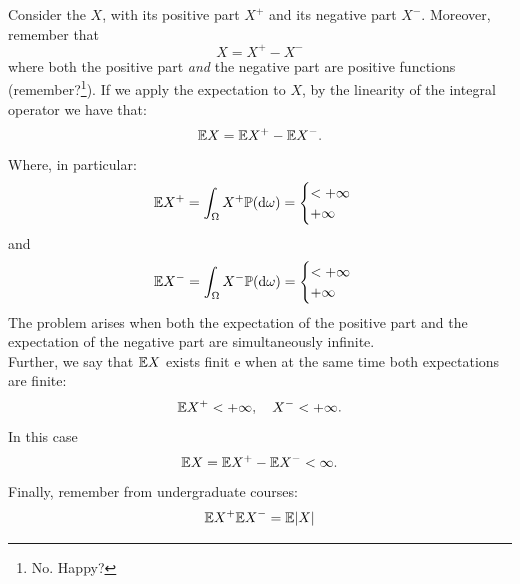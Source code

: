 \documentclass{report}
\begin{document}
Consider the \rv{} $X$, with its positive part $X^+$ and its negative part $X^-$. Moreover, remember that 
\[X=X^+-X^-\]
where both the positive part \textit{and} the negative part are positive functions (remember?\footnote{No. Happy?}). If we apply the expectation to $X$, by the linearity of the integral operator we have that:
\[\mathbb{E} X=\mathbb{E} X^+-\mathbb{E} X^-.\]
Where, in particular:
\[\mathbb{E} X^+=\int_\Omega X^+\mathbb{P}(\mathop{}\!\mathrm{d}\omega)=\begin{cases}
	<+\infty\\
	+\infty
\end{cases}\]
and
\[\mathbb{E} X^-=\int_\Omega X^-\mathbb{P}(\mathop{}\!\mathrm{d}\omega)=\begin{cases}
	<+\infty\\
	+\infty
\end{cases}\]
The problem arises when both the expectation of the positive part and the expectation of the negative part are simultaneously infinite.\\
Further, we say that $\mathbb{E} X$ exists finit e when at the same time both expectations are finite: 
\[\mathbb{E} X^+<+\infty,\quad X^-<+\infty.\]
In this case
\[\mathbb{E} X=\mathbb{E} X^+-\mathbb{E} X^-<\infty.\]
Finally, remember from undergraduate courses:
\[\mathbb{E} X^+\mathbb{E} X^-=\mathbb{E} |X|\]
\end{document}
